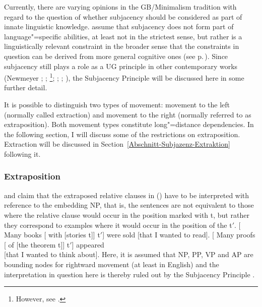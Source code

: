 Currently, there are varying opinions in the GB/Minimalism tradition with regard to the question of whether subjacency should be considered as part of innate linguistic knowledge.
\citet*{HCF2002a} assume that subjacency does not form part of language"=specific abilities, at least not in the strictest sense, but rather is a linguistically relevant constraint
in the broader sense that the constraints in question can be derived from more general cognitive ones (see
p.\,\pageref{Seite-Subjazenz-Performanz}). Since subjacency still plays a role as a UG principle in other contemporary works (Newmeyer \citeyear[, 74--75]{Newmeyer2005a};
\citeyear[]{Newmeyer2004b}; 
\citealp{Baltin2006a}\footnote{
However, see .
}; \citealp{Baker2009a}; \citealp{Freidin2009a}; \citealp{Rizzi2009a,Rizzi2009b}), 
the Subjacency Principle will be discussed here in some further detail.

It is possible to distinguish two types of movement: movement to the left (normally called extraction) and movement to the right (normally referred to as
extraposition). Both movement types constitute long"=distance dependencies.
In the following section, I will discuss some of the restrictions on extraposition. Extraction will be discussed in Section~\ref{Abschnitt-Subjazenz-Extraktion} following it.

\subsubsection{Extraposition}

\mbox{}\citet{Baltin81a} and \citet[]{Chomsky86b} claim that the extraposed relative clauses in () have to be interpreted with
reference to the embedding NP, that is, the sentences are not equivalent to those where the relative clause would occur in the position marked with t, but rather
they correspond to examples where it would occur in the position of the t$'$.
\eal
\label{ex-chomsky-sub}
\ex {}[ Many books [ with [stories t]] t$'$]  were sold [that I wanted to read].
\ex {}[ Many proofs [ of [the theorem t]] t$'$] appeared\\
    {}[that I wanted to think about].
\zl
Here, it is assumed that NP, PP, VP and AP are bounding nodes for rightward movement (at least in English) and the interpretation in question here
is thereby ruled out by the Subjacency Principle \citep[]{Baltin81a}. 

